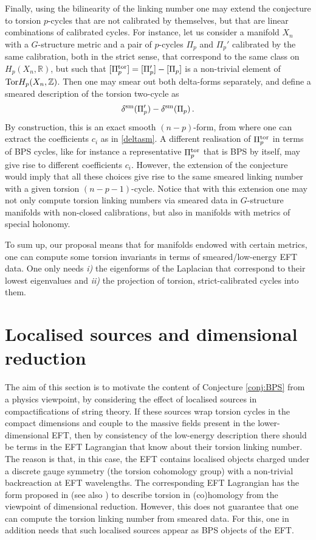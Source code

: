 \documentclass[11pt]{article}
\def\be{\begin{equation}}
\def\ee{\end{equation}}
\newcommand{\IR}{\mathbb{R}}
\newcommand{\IZ}{\mathbb{Z}}
\begin{document}
Finally, using the bilinearity of the linking number one may extend the conjecture to torsion $p$-cycles that are not calibrated by themselves, but that are linear combinations of calibrated cycles. For instance, let us consider a manifold $X_n$ with a $G$-structure metric and a pair of $p$-cycles $\Pi_p$ and $\Pi_p'$ calibrated by the same calibration, both in the strict sense, that correspond to the same class on $H_p(X_n, \IR)$, but such that $[\Pi_p^{\rm tor}] = [\Pi_p'] - [\Pi_p]$ is a non-trivial element of ${\rm Tor} H_p(X_n, \IZ)$. Then one may smear out both delta-forms separately, and define a smeared description of the torsion two-cycle as
\be
\delta^{\rm sm} (\Pi_p') - \delta^{\rm sm} (\Pi_p) \, .
\label{deldif}
\ee
By construction, this is an exact smooth $(n-p)$-form, from where one can extract the coefficients $c_i$ as in \eqref{deltasm}. A different realisation of $\Pi_p^{\rm tor}$ in terms of BPS cycles, like for instance a representative $\Pi_p^{\rm tor}$ that is BPS by itself, may give rise to different coefficients $c_i$. However, the extension of the conjecture would imply that all these choices give rise to the same smeared linking number with a given torsion $(n-p-1)$-cycle. Notice that with this extension one may not only compute torsion linking numbers via smeared data in $G$-structure manifolds with non-closed calibrations, but also in manifolds with metrics of special holonomy. 

To sum up, our proposal means that for manifolds endowed with certain metrics, one can compute some torsion invariants in terms of smeared/low-energy EFT data. One only needs {\it i)} the eigenforms of the Laplacian that correspond to their lowest eigenvalues and {\it ii)} the projection of torsion, strict-calibrated cycles into them. 



\section{Localised sources and dimensional reduction}
\label{s:dimred}

The aim of this section is to motivate the content of Conjecture \ref{conj:BPS} from a physics viewpoint, by considering the effect of localised sources in compactifications of string theory. If these sources wrap torsion cycles in the compact dimensions and couple to the massive fields present in the lower-dimensional EFT, then by consistency of the low-energy description there should be terms in the EFT Lagrangian that know about their torsion linking number. The reason is that, in this case, the EFT contains localised objects charged under a discrete gauge symmetry (the torsion cohomology group) with a non-trivial backreaction at EFT wavelengths. The corresponding EFT Lagrangian has the form proposed in \cite{Camara:2011jg} (see also \cite{Grimm:2011tb,Berasaluce-Gonzalez:2012abm,Berasaluce-Gonzalez:2012awn,Mayrhofer:2014laa,Grimm:2015ona,Braun:2017oak}) to describe torsion in (co)homology from the viewpoint of dimensional reduction. However, this does not guarantee that one can compute the torsion linking number from smeared data. For this, one in addition needs that such localised sources appear as BPS objects of the EFT. 
\end{document}
